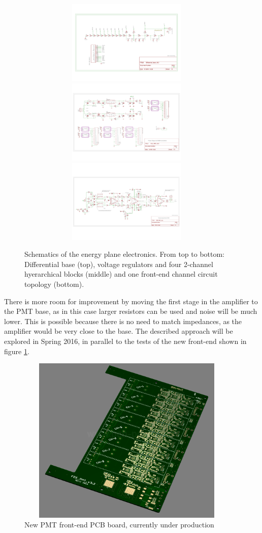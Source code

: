 \begin{figure}
  \begin{center}
    \includegraphics[height=4cm,width=0.95\textwidth]{img/Differential_base}
    \includegraphics[height=4cm,width=0.95\textwidth]{img/de-coupling_board}
	  \includegraphics[height=4cm,width=0.95\textwidth]{img/FEE_PMT}
  \end{center}
  \caption{Schematics of the energy plane electronics. From top to bottom: Differential base (top), voltage regulators and four 2-channel hyerarchical blocks (middle) and one front-end channel circuit topology (bottom).  }
  \label{fig:fee_scheme} 
\end{figure}

There is more room for improvement by moving the first stage in the amplifier to the PMT base, as in this case larger resistors can be used and noise will be much lower. 
This is possible because there is no need to match impedances, as the amplifier would be very close to the base. The described approach will be explored in Spring 2016, in parallel to the tests
of the new front-end shown in figure \ref{fig:fee_scheme}.

\begin{figure}
  \begin{center}
    \includegraphics[height=8cm,width=0.95\textwidth]{img/FEE_PMT_PCB}
  \end{center}
  \caption{New PMT front-end PCB board, currently under production}
  \label{fig:fee_pcb_scheme} 
\end{figure}